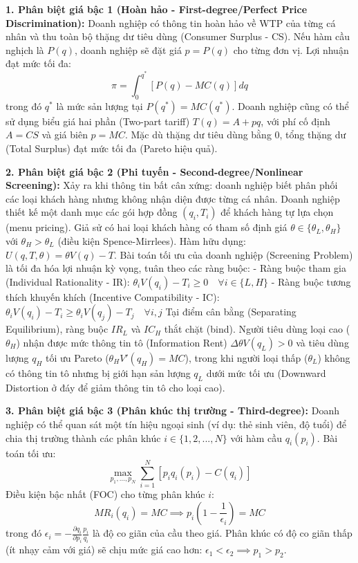 \documentclass[
]{article}
\begin{document}
\textbf{1. Phân biệt giá bậc 1 (Hoàn hảo - First-degree/Perfect Price
Discrimination):} Doanh nghiệp có thông tin hoàn hảo về WTP của từng cá
nhân và thu toàn bộ thặng dư tiêu dùng (Consumer Surplus - CS). Nếu hàm
cầu nghịch là \(P(q)\), doanh nghiệp sẽ đặt giá \(p = P(q)\) cho từng
đơn vị. Lợi nhuận đạt mức tối đa:
\[ \pi = \int_{0}^{q^*} [P(q) - MC(q)] dq \] trong đó \(q^*\) là mức sản
lượng tại \(P(q^*) = MC(q^*)\). Doanh nghiệp cũng có thể sử dụng biểu
giá hai phần (Two-part tariff) \(T(q) = A + pq\), với phí cố định
\(A = CS\) và giá biên \(p = MC\). Mặc dù thặng dư tiêu dùng bằng 0,
tổng thặng dư (Total Surplus) đạt mức tối đa (Pareto hiệu quả).

\textbf{2. Phân biệt giá bậc 2 (Phi tuyến - Second-degree/Nonlinear
Screening):} Xảy ra khi thông tin bất cân xứng: doanh nghiệp biết phân
phối các loại khách hàng nhưng không nhận diện được từng cá nhân. Doanh
nghiệp thiết kế một danh mục các gói hợp đồng \((q_i, T_i)\) để khách
hàng tự lựa chọn (menu pricing). Giả sử có hai loại khách hàng có tham
số định giá \(\theta \in \{\theta_L, \theta_H\}\) với
\(\theta_H > \theta_L\) (điều kiện Spence-Mirrlees). Hàm hữu dụng:
\(U(q, T, \theta) = \theta V(q) - T\). Bài toán tối ưu của doanh nghiệp
(Screening Problem) là tối đa hóa lợi nhuận kỳ vọng, tuân theo các ràng
buộc: - Ràng buộc tham gia (Individual Rationality - IR):
\(\theta_i V(q_i) - T_i \ge 0 \quad \forall i \in \{L, H\}\) - Ràng buộc
tương thích khuyến khích (Incentive Compatibility - IC):
\(\theta_i V(q_i) - T_i \ge \theta_i V(q_j) - T_j \quad \forall i, j\)
Tại điểm cân bằng (Separating Equilibrium), ràng buộc \(IR_L\) và
\(IC_H\) thắt chặt (bind). Người tiêu dùng loại cao (\(\theta_H\)) nhận
được mức thông tin tô (Information Rent) \(\Delta \theta V(q_L) > 0\) và
tiêu dùng lượng \(q_H\) tối ưu Pareto (\(\theta_H V'(q_H) = MC\)), trong
khi người loại thấp (\(\theta_L\)) không có thông tin tô nhưng bị giới
hạn sản lượng \(q_L\) dưới mức tối ưu (Downward Distortion ở đáy để giảm
thông tin tô cho loại cao).

\textbf{3. Phân biệt giá bậc 3 (Phân khúc thị trường - Third-degree):}
Doanh nghiệp có thể quan sát một tín hiệu ngoại sinh (ví dụ: thẻ sinh
viên, độ tuổi) để chia thị trường thành các phân khúc
\(i \in \{1, 2, ..., N\}\) với hàm cầu \(q_i(p_i)\). Bài toán tối ưu:
\[ \max_{p_1, ..., p_N} \sum_{i=1}^N [p_i q_i(p_i) - C(q_i)] \] Điều
kiện bậc nhất (FOC) cho từng phân khúc \(i\):
\[ MR_i(q_i) = MC \implies p_i \left( 1 - \frac{1}{\epsilon_i} \right) = MC \]
trong đó
\(\epsilon_i = -\frac{\partial q_i}{\partial p_i} \frac{p_i}{q_i}\) là
độ co giãn của cầu theo giá. Phân khúc có độ co giãn thấp (ít nhạy cảm
với giá) sẽ chịu mức giá cao hơn:
\(\epsilon_1 < \epsilon_2 \implies p_1 > p_2\).
\end{document}

